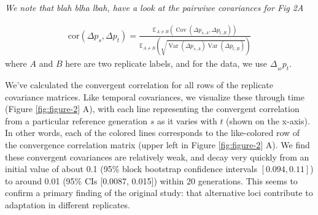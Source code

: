 \documentclass[11pt]{article}
\newcommand{\vb}[1]{{\it \color{blue} #1}}
\newcommand{\E}{\mathbb{E}}
\DeclareMathOperator{\var}{Var}
\DeclareMathOperator{\cov}{Cov}
\begin{document}
\vb{We note that blah blha lbah, have a look at the pairwiwe covariances for
Fig 2A}

\begin{align}
  \label{eq:conv-corr}
  \mathrm{cor}(\Delta p_s, \Delta p_t) = \frac{\E_{A\ne B} \left( \cov(\Delta p_{s,A}, \Delta p_{t,B}) \right)}{\E_{A\ne B} \left( \sqrt{\var(\Delta p_{s,A}) \var(\Delta p_{t,B})} \right)}
\end{align}
%
where $A$ and $B$ here are two replicate labels, and for the
\textcite{Barghi2019-qy} data, we use $\Delta_{_{10}} p_t$.

We've calculated the convergent correlation for all rows of the replicate
covariance matrices. Like temporal covariances, we visualize these through time
(Figure \ref{fig:figure-2} A), with each line representing the convergent
correlation from a particular reference generation $s$ as it varies with $t$
(shown on the x-axis). In other words, each of the colored lines corresponds to
the like-colored row of the convergence correlation matrix (upper left in
Figure \ref{fig:figure-2} A). We find these convergent covariances are
relatively weak, and decay very quickly from an initial value of about 0.1
(95\% block bootstrap confidence intervals $[0.094, 0.11]$) to around 0.01
(95\% CIs [0.0087, 0.015]) within 20 generations. This seems to confirm a
primary finding of the original \textcite{Barghi2019-qy} study: that
alternative loci contribute to adaptation in different replicates.
\end{document}
